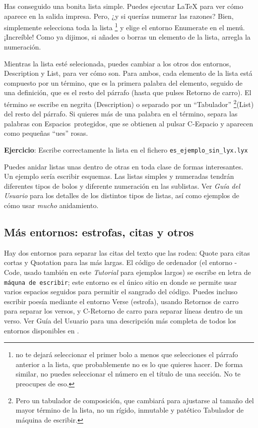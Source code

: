 Has conseguido una bonita lista simple. Puedes ejecutar \LaTeX{} para
ver cómo aparece en la salida impresa. Pero, ¿y si querías numerar
las razones? Bien, simplemente selecciona toda la lista%
\footnote{\LyX{} no te dejará seleccionar el primer bolo a menos que selecciones
el párrafo anterior a la lista, que probablemente no es lo que quieres
hacer. De forma similar, no puedes seleccionar el número en el título
de una sección. No te preocupes de eso.%
} y elige el entorno \textsf{Enumerate} en el menú. ¡Increíble! Como
ya dijimos, si añades o borras un elemento de la lista, \LyX{} arregla
la numeración.

Mientras la lista esté selecionada, puedes cambiar a los otros dos
entornos, \textsf{Description} y \textsf{List}, para ver cómo son.
Para ambos, cada elemento de la lista está compuesto por un término,
que es la primera palabra del elemento, seguido de una definición,
que es el resto del párrafo (hasta que pulses \textsf{Retorno de carro}).
El término se escribe en negrita (\textsf{Description}) o separado
por un {}``Tabulador''%
\footnote{Pero un tabulador de composición, que cambiará para ajustarse al tamaño
del mayor término de la lista, no un rígido, inmutable y patético
\textsf{Tabulador} de máquina de escribir.%
}(\textsf{List}) del resto del párrafo. Si quieres más de una palabra
en el término, separa las palabras con \textsf{Espacios~protegidos},
que se obtienen al pulsar \textsf{C-Espacio} y aparecen como pequeñas
{}``ues'' rosas.

\textbf{Ejercicio}: Escribe correctamente la lista en el fichero \texttt{es\_ejemplo\_sin\_lyx.lyx}

Puedes anidar listas unas dentro de otras en toda clase de formas
interesantes. Un ejemplo sería escribir esquemas. Las listas simples
y numeradas tendrán diferentes tipos de bolos y diferente numeración
en las sublistas. Ver \emph{Guía del Usuario} para los detalles de
los distintos tipos de listas, así como ejemplos de cómo usar \emph{mucho}
anidamiento.


\subsection{Más entornos: estrofas, citas y otros}

Hay dos entornos para separar las citas del texto que las rodea: \textsf{Quote}
para citas cortas y \textsf{Quotation} para las más largas. El código
de ordenador (el entorno \textsf{\LyX{}-Code}, usado también en este
\emph{Tutorial} para ejemplos largos) se escribe en letra de \texttt{máquna
de escribir}; este entorno es el único sitio en \LyX{} donde se permite
usar varios espacios seguidos para permitir el sangrado del código.
Puedes incluso escribir poesía mediante el entorno \textsf{Verse} (estrofa), usando \textsf{Retornos
de carro} para separar los versos, y \textsf{C-Retorno de carro} para
separar líneas dentro de un verso. Ver Guía del Usuario para una descripción
más completa de todos los entornos disponibles en \LyX{}.

